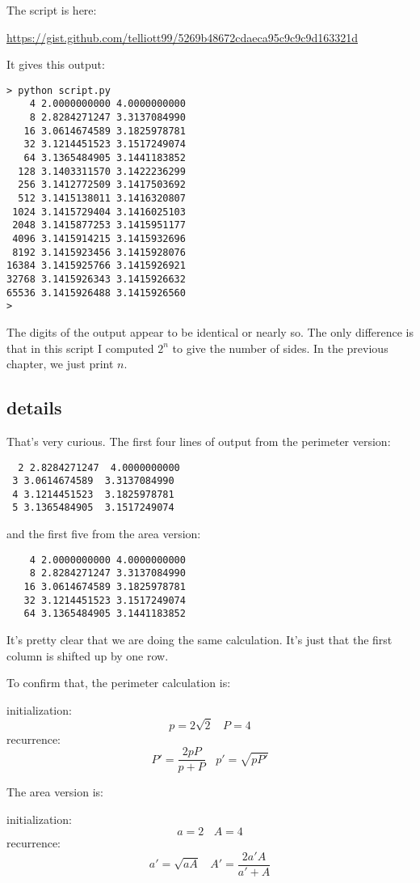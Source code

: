 \documentclass[11pt, oneside]{article}
\begin{document}
The script is here:

\url{https://gist.github.com/telliott99/5269b48672cdaeca95c9c9c9d163321d}

It gives this output:

\begin{verbatim}
> python script.py 
    4 2.0000000000 4.0000000000
    8 2.8284271247 3.3137084990
   16 3.0614674589 3.1825978781
   32 3.1214451523 3.1517249074
   64 3.1365484905 3.1441183852
  128 3.1403311570 3.1422236299
  256 3.1412772509 3.1417503692
  512 3.1415138011 3.1416320807
 1024 3.1415729404 3.1416025103
 2048 3.1415877253 3.1415951177
 4096 3.1415914215 3.1415932696
 8192 3.1415923456 3.1415928076
16384 3.1415925766 3.1415926921
32768 3.1415926343 3.1415926632
65536 3.1415926488 3.1415926560
>
\end{verbatim}

The digits of the output appear to be identical or nearly so.  The only difference is that in this script I computed $2^n$ to give the number of sides.  In the previous chapter, we just print $n$.

\subsection*{details}

That's very curious.  The first four lines of output from the perimeter version:

\begin{verbatim}
  2 2.8284271247  4.0000000000
 3 3.0614674589  3.3137084990
 4 3.1214451523  3.1825978781
 5 3.1365484905  3.1517249074
\end{verbatim}

and the first five from the area version:
\begin{verbatim}
    4 2.0000000000 4.0000000000
    8 2.8284271247 3.3137084990
   16 3.0614674589 3.1825978781
   32 3.1214451523 3.1517249074
   64 3.1365484905 3.1441183852
\end{verbatim}

It's pretty clear that we are doing the same calculation.  It's just that the first column is shifted up by one row.

To confirm that, the perimeter calculation is:

initialization:
\[ p = 2 \sqrt{2} \ \ \ \ P = 4 \]
recurrence:
\[ P' = \frac{2pP}{p + P} \ \ \ \ p' = \sqrt{pP'} \]

The area version is:

initialization:
\[ a = 2 \ \ \ \ A = 4 \]
recurrence:
\[ a' =  \sqrt{aA} \ \ \ \  A' = \frac{2a'A}{a' + A} \]
\end{document}

